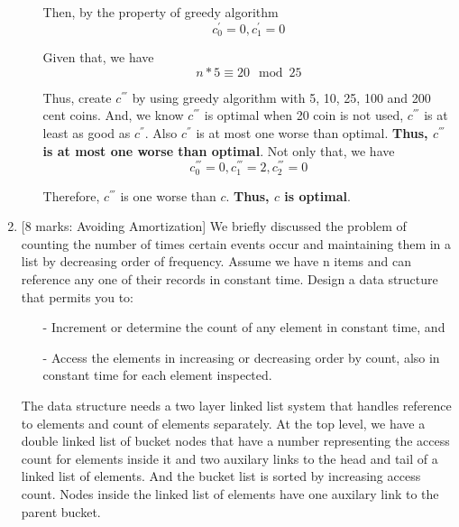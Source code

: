 \documentclass[12pt]{article}
\begin{document}
\begin{enumerate}
\begin{itemize}
Then, by the property of greedy algorithm
\begin{equation}
c_{0}^{'} = 0, c_{1}^{'} = 0
\end{equation}

Given that, we have
\begin{equation}
n * 5 \equiv 20 \mod{25}
\end{equation}

Thus, create $c^{'''}$ by using greedy algorithm with 5, 10, 25, 100 and 200 cent coins. And, we know $c^{'''}$ is optimal when 20 coin is not used, $c^{'''}$ is at least as good as $c^{''}$. Also $c^{''}$ is at most one worse than optimal. \textbf{Thus, $c^{'''}$ is at most one worse than optimal}. Not only that, we have
\begin{equation}
c_{0}^{'''} = 0, c_{1}^{'''} = 2, c_{2}^{'''} = 0
\end{equation}

Therefore, $c^{'''}$ is one worse than $c$. \textbf{Thus, $c$ is optimal}.

\end{itemize}

\medskip

\item{} [8 marks: Avoiding Amortization]
We briefly discussed the problem of counting the number of times certain events occur and maintaining them in a list by decreasing order of frequency. Assume we have n items and can reference any one of their records in constant time. Design a data structure that permits you to:
\begin{itemize}

\item[-] Increment or determine the count of any element in constant time, and

\item[-] Access the elements in increasing or decreasing order by count, also in constant time for each element inspected.

\end{itemize}

The data structure needs a two layer linked list system that handles reference to elements and count of elements separately. At the top level, we have a double linked list of bucket nodes that have a number representing the access count for elements inside it and two auxilary links to the head and tail of a linked list of elements. And the bucket list is sorted by increasing access count. Nodes inside the linked list of elements have one auxilary link to the parent bucket.


\end{enumerate}
\end{document}
